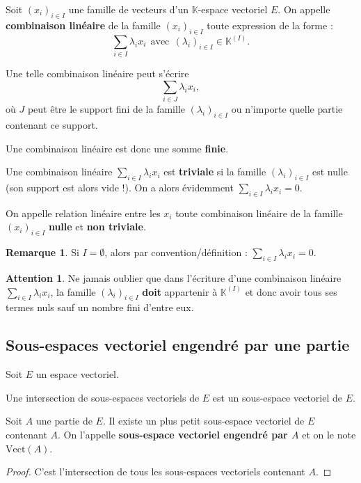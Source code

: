 \documentclass[french]{article}
\newcommand{\K}{\mathbb{K}}
\newcommand{\Vect}{\text{Vect}}
\theoremstyle{plain}
\theoremstyle{definition}
\newtheorem*{rmq}{Remarque}
\newtheorem*{attention}{Attention}
\theoremstyle{remark}
\begin{document}
\begin{dfn}{}
	Soit $(x_i)_{i\in I}$ une famille de vecteurs d'un $\K$-espace vectoriel $E$. On appelle \textbf{combinaison linéaire} de la famille $(x_i)_{i\in I}$ toute expression de la forme : $$\sum_{i\in I}\lambda_ix_i\ \ \text{avec}\ \ (\lambda_i)_{i\in I}\in\K^{(I)}.$$
\end{dfn}
Une telle combinaison linéaire peut s'écrire $$\sum_{i\in J}\lambda_i x_i,$$ où $J$ peut être le support fini de la famille $(\lambda_i)_{i\in I}$ ou n'importe quelle partie contenant ce support.

Une combinaison linéaire est donc une somme \textbf{finie}.

Une combinaison linéaire $\displaystyle\sum_{i\in I}\lambda_ix_i$ est \textbf{triviale} si la famille $(\lambda_i)_{i\in I}$ est nulle (son support est alors vide !). On a alors évidemment $\displaystyle\sum_{i\in I}\lambda_ix_i=0$.

On appelle relation linéaire entre les $x_i$ toute combinaison linéaire de la famille $(x_i)_{i\in I}$ \textbf{nulle} et \textbf{non triviale}.

\begin{rmq}
	Si $I=\emptyset$, alors par convention/définition : $\displaystyle\sum_{i\in I}\lambda_ix_i=0$.
\end{rmq}

\begin{attention}
	Ne jamais oublier que dans l'écriture d'une combinaison linéaire $\displaystyle\sum_{i\in I}\lambda_ix_i$, la famille $(\lambda_i)_{i\in I}$ \textbf{doit} appartenir à $\K^{(I)}$ et donc avoir tous ses termes nuls sauf un nombre fini d'entre eux.
\end{attention}

\subsection{Sous-espaces vectoriel engendré par une partie}
Soit $E$ un espace vectoriel.

\begin{prop}
	Une intersection de sous-espaces vectoriels de $E$ est un sous-espace vectoriel de $E$.
\end{prop}

\begin{dfn}{}
	Soit $A$ une partie de $E$. Il existe un plus petit sous-espace vectoriel de $E$ contenant $A$. On l'appelle \textbf{sous-espace vectoriel engendré par $A$} et on le note $\Vect(A)$.
\end{dfn}
\begin{proof}
	C'est l'intersection de tous les sous-espaces vectoriels contenant $A$.
\end{proof}
\end{document}
